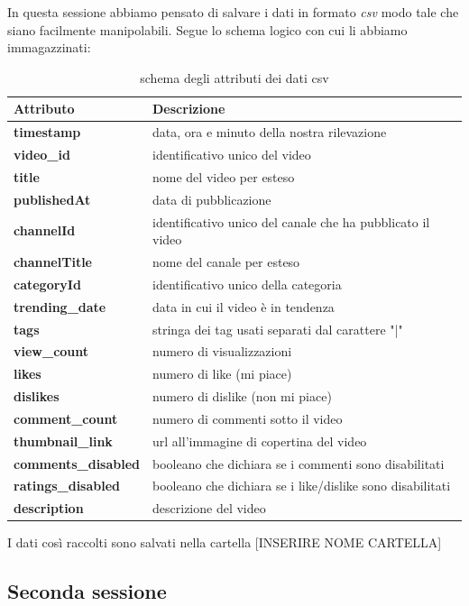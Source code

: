 In questa sessione abbiamo pensato di salvare i dati in formato \textit{csv}
modo tale che siano facilmente manipolabili. Segue lo schema logico con cui li abbiamo immagazzinati:
\begin{table}[H]
	\centering
	\begin{tabular}{l|l}
		\textbf{Attributo} & \textbf{Descrizione} \\
		\hline
		\textbf{timestamp} & data, ora e minuto della nostra rilevazione \\\hline
		\textbf{video\_id} & identificativo unico del video\\\hline
		\textbf{title} & nome del video per esteso\\\hline
		\textbf{publishedAt} & data di pubblicazione\\\hline
		\textbf{channelId} & identificativo unico del canale che ha pubblicato il video\\\hline
		\textbf{channelTitle} & nome del canale per esteso\\\hline
		\textbf{categoryId} & identificativo unico della categoria\\\hline
		\textbf{trending\_date} & data in cui il video è in tendenza\\\hline
		\textbf{tags} & stringa dei tag usati separati dal carattere "|"\\\hline
		\textbf{view\_count} & numero di visualizzazioni\\\hline
		\textbf{likes} & numero di like (mi piace)\\\hline
		\textbf{dislikes} & numero di dislike (non mi piace)\\\hline
		\textbf{comment\_count} & numero di commenti sotto il video\\\hline
		\textbf{thumbnail\_link} & url all'immagine di copertina del video\\\hline
		\textbf{comments\_disabled} & booleano che dichiara se i commenti sono disabilitati\\\hline
		\textbf{ratings\_disabled} & booleano che dichiara se i like/dislike sono disabilitati\\\hline
		\textbf{description} & descrizione del video\\
		\hline
	\end{tabular}
	\caption{schema degli attributi dei dati csv}
\end{table}

I dati così raccolti sono salvati nella cartella [INSERIRE NOME CARTELLA]

\subsection*{Seconda sessione}

